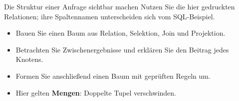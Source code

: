 \begin{frame}[t]{Die Struktur einer Anfrage sichtbar machen}
Nutzen Sie die hier gedruckten Relationen; ihre Spaltennamen unterscheiden sich vom SQL-Beispiel.
\medskip
\begin{itemize}
\item Bauen Sie einen Baum aus Relation, Selektion, Join und Projektion.
\item Betrachten Sie Zwischenergebnisse und erklären Sie den Beitrag jedes Knotens.
\item Formen Sie anschließend einen Baum mit geprüften Regeln um.
\item Hier gelten \textbf{Mengen}: Doppelte Tupel verschwinden.
\end{itemize}
\end{frame}
